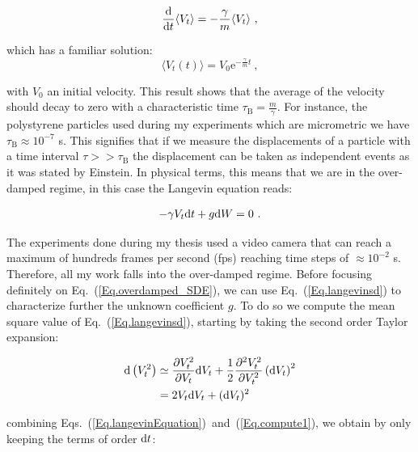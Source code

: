 \begin{equation}
	\frac{ \textnormal{d}}{\textnormal{d}t}\langle V_t \rangle = - \frac{\gamma}{m} \langle V_t \rangle ~,
\end{equation}

which has a familiar solution:
\begin{equation}
	\langle V_t (t) \rangle =   V_0 \mathrm{e}^{-\frac{\gamma}{m} t}~,
	\label{Eq.int_V_langevin}
\end{equation}

with $V_0$ an initial velocity. This result shows that the average of the velocity should decay to zero with a characteristic time $\tau_\mathrm{B} = \frac{m}{\gamma}$. For instance, the polystyrene particles used during my experiments which are micrometric we have $\tau_\mathrm{B} \approx 10^{-7}$ s. This signifies that if we measure the displacements of a particle with a time interval $ \tau  >> \tau _\mathrm{B} $ the displacement can be taken as independent events as it was stated by Einstein. In physical terms, this means that we are in the over-damped regime, in this case the Langevin equation reads:

\begin{equation}
-\gamma V_t \textnormal{d}t  + g  \textnormal{d}W = 0~.	
\label{Eq.overdamped_SDE}
\end{equation}

The experiments done during my thesis used a video camera that can reach a maximum of hundreds frames per second (\gls{fps}) reaching time steps of $\approx 10^{-2}$ s. Therefore, all my work falls into the over-damped regime. Before focusing definitely on Eq.~(\ref{Eq.overdamped_SDE}), we can use Eq.~(\ref{Eq.langevinsd}) to characterize further the unknown coefficient $g$. To do so we compute the mean square value of Eq.~(\ref{Eq.langevinsd}), starting by taking the second order Taylor expansion:


\begin{equation}
	\begin{aligned}
		\textnormal{d}\left(V_t^2\right) &\simeq \frac{\partial V_t ^ 2}{\partial V_t} \textnormal{d} V_t + \frac{1}{2} \frac{\partial ^2 V_t^2}{\partial V_t ^2} \left( \textnormal{d}V_t \right)^2  \\
		& = 2 V_t \textnormal{d}V_t + (\textnormal{d}V_t)^2 \\ 
	\end{aligned}
	\label{Eq.compute1}
\end{equation}

combining Eqs.~(\ref{Eq.langevinEquation})~and~(\ref{Eq.compute1}), we obtain by only keeping  the terms of order $\textnormal{d}t$:

